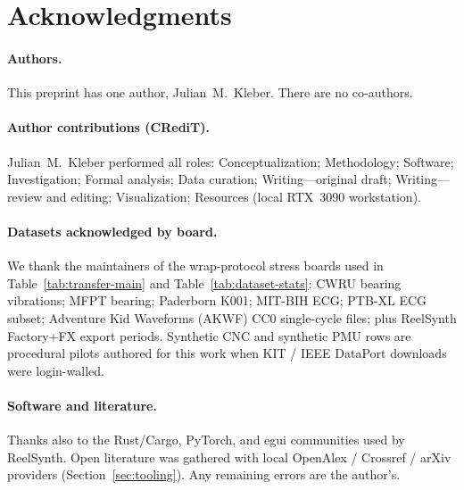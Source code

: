 \section*{Acknowledgments}
\label{sec:acknowledgments}

\paragraph{Authors.}
This preprint has one author, Julian~M.~Kleber. There are no co-authors.

\paragraph{Author contributions (CRediT).}
Julian~M.~Kleber performed all roles: Conceptualization; Methodology; Software; Investigation; Formal analysis; Data curation; Writing---original draft; Writing---review and editing; Visualization; Resources (local RTX~3090 workstation).

\paragraph{Datasets acknowledged by board.}
We thank the maintainers of the wrap-protocol stress boards used in Table~\ref{tab:transfer-main} and Table~\ref{tab:dataset-stats}:
CWRU bearing vibrations; MFPT bearing; Paderborn K001; MIT-BIH ECG; PTB-XL ECG subset; Adventure Kid Waveforms (AKWF) CC0 single-cycle files; plus ReelSynth Factory+FX export periods.
Synthetic CNC and synthetic PMU rows are procedural pilots authored for this work when KIT / IEEE DataPort downloads were login-walled.

\paragraph{Software and literature.}
Thanks also to the Rust/Cargo, PyTorch, and egui communities used by ReelSynth.
Open literature was gathered with local OpenAlex / Crossref / arXiv providers (Section~\ref{sec:tooling}).
Any remaining errors are the author's.
